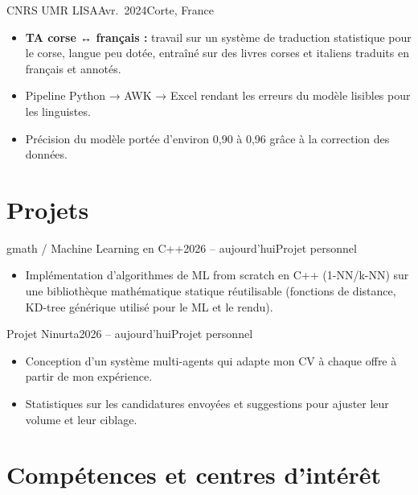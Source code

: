 \documentclass[french]{resume}
\begin{document}
  {CNRS UMR LISA}{Avr.\ 2024}{Corte, France}
\begin{itemize}
  \item \textbf{TA corse ↔ français :} travail sur un système de traduction statistique pour le corse, langue peu dotée, entraîné sur des livres corses et italiens traduits en français et annotés.
  \item Pipeline Python → AWK → Excel rendant les erreurs du modèle lisibles pour les linguistes.
  \item Précision du modèle portée d'environ 0,90 à 0,96 grâce à la correction des données.
\end{itemize}

\section{Projets}
  {gmath / Machine Learning en C++}{2026 -- aujourd'hui}{Projet personnel}
\begin{itemize}
  \item Implémentation d'algorithmes de ML from scratch en C++ (1-NN/k-NN) sur une bibliothèque mathématique statique réutilisable (fonctions de distance, KD-tree générique utilisé pour le ML et le rendu).
\end{itemize}
  {Projet Ninurta}{2026 -- aujourd'hui}{Projet personnel}
\begin{itemize}
  \item Conception d'un système multi-agents qui adapte mon CV à chaque offre à partir de mon expérience.
  \item Statistiques sur les candidatures envoyées et suggestions pour ajuster leur volume et leur ciblage.
\end{itemize}

\section{Compétences et centres d'intérêt}
\begin{cvskills}
\end{cvskills}
\end{document}
